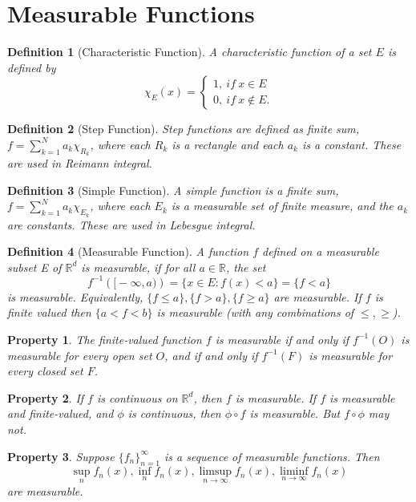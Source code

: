 \documentclass{report}
\theoremstyle{upthm}
\newtheorem{defn}{Definition}
\newtheorem{property}{Property}
\newcommand{\reals}{\mathbb{R}}
\newcommand{\set}[1]{\big\lbrace #1 \big\rbrace}
\begin{document}
\section{Measurable Functions}
\begin{defn}[Characteristic Function]
	A characteristic function of a set $E$ is defined by 
	$$
	 \chi_E(x) = \begin{cases}
	1,\ if\ x \in E \\
	0,\ if\ x \notin E.
	\end{cases}
	$$
\end{defn}
\begin{defn}[Step Function]
	Step functions are defined as finite sum, $ f = \sum_{k=1}^{N} a_k \chi_{R_k} $, where each $R_k$ is a rectangle and each $a_k$ is a constant. These are used in Reimann integral.
\end{defn}
\begin{defn}[Simple Function]
	A simple function is a finite sum,  $ f = \sum_{k=1}^{N} a_k \chi_{E_k} $, where each $E_k$ is a measurable set of finite measure, and the $a_k$ are constants. These are used in Lebesgue integral.
\end{defn}

\begin{defn}[Measurable Function]
	A function $f$ defined on a measurable subset E of $\reals^d$ is measurable,
	if for all $ a \in \reals$, the set
	$$f^{-1}(\big[-\infty, a\big)) = \set{x \in E: f(x) < a} = \set{f < a}$$ is measurable. Equivalently, $\set{f \leq a}, \set{f > a}, \set{f \geq a}$ are measurable. If $f$ is finite valued then $\set{a < f < b}$ is measurable (with any combinations of $\leq, \geq$).
\end{defn} 
\begin{property}
	The finite-valued function $f$ is measurable if and only if $f^{-1}(O)$ is measurable for every open set $O$, and if and only if $f^{-1}(F)$ is measurable for every closed set $F$.
\end{property}
\begin{property}
	If $f$ is continuous on $\reals^d$, then $f$ is measurable. If $f$ is measurable and finite-valued, and $\phi$ is continuous, then  $\phi \circ f$ is measurable. But $f \circ \phi$ may not.
\end{property}
\begin{property}
	Suppose $\set{f_n}_{n=1}^\infty$ is a sequence of measurable functions. Then $$\sup_n f_n(x), \inf_n f_n(x), \limsup_{n \rightarrow \infty} f_n(x), \liminf_{n \rightarrow \infty} f_n(x)  $$ are measurable.
\end{property}
\end{document}
